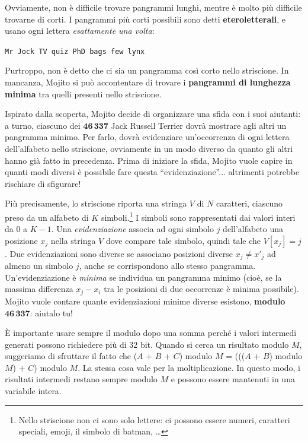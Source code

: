 Ovviamente, non è difficile trovare pangrammi lunghi, mentre è molto più
difficile trovarne di corti. I pangrammi più corti possibili sono detti
\textbf{eteroletterali}, e usano ogni lettera \emph{esattamente una volta}:%
%
\begin{center}
  \texttt{Mr Jock TV quiz PhD bags few lynx}
\end{center}%
%
Purtroppo, non è detto che ci sia un pangramma così corto nello striscione. In
mancanza, Mojito si può accontentare di trovare i \textbf{pangrammi di lunghezza
minima} tra quelli presenti nello striscione.

Ispirato dalla scoperta, Mojito decide di organizzare una sfida con i suoi
aiutanti: a turno, ciascuno dei $\mathbf{46\,337}$ Jack Russell Terrier dovrà
mostrare agli altri un pangramma minimo. Per farlo, dovrà evidenziare
un'occorrenza di ogni lettera dell'alfabeto nello striscione, ovviamente in un
modo diverso da quanto gli altri hanno già fatto in precedenza. Prima di
iniziare la sfida, Mojito vuole capire in quanti modi diversi è possibile fare
questa ``evidenziazione''... altrimenti potrebbe rischiare di sfigurare!

Più precisamente, lo striscione riporta una stringa $V$ di $N$ caratteri,
ciascuno preso da un alfabeto di $K$ simboli.\footnote{Nello striscione non ci
sono solo lettere: ci possono essere numeri, caratteri speciali, emoji, il
simbolo di batman, \dots} I simboli sono rappresentati dai valori interi da $0$
a $K-1$. Una \emph{evidenziazione} associa ad ogni simbolo $j$ dell'alfabeto una
posizione $x_j$ nella stringa $V$ dove compare tale simbolo, quindi tale che
$V[x_j] = j$. Due evidenziazioni sono diverse se associano posizioni diverse
$x_j \neq x'_j$ ad almeno un simbolo $j$, anche se corrispondono allo stesso
pangramma. Un'evidenziazione è \emph{minima} se individua un pangramma minimo
(cioè, se la massima differenza $x_j - x_i$ tra le posizioni di due occorrenze è
minima possibile). Mojito vuole contare quante evidenziazioni minime diverse
esistono, \textbf{modulo} $\mathbf{46\,337}$: aiutalo tu!



\Implementation

\begin{danger}
  È importante usare sempre il modulo dopo una somma perché i valori intermedi
  generati possono richiedere più di 32 bit. Quando si cerca un risultato modulo
  $M$, suggeriamo di sfruttare il fatto che ($A$ + $B$ + $C$) modulo $M$ =
  ((($A$ + $B$) modulo $M$) + $C$) modulo $M$. La stessa cosa vale per la
  moltiplicazione. In questo modo, i risultati intermedi restano sempre modulo
  $M$ e possono essere mantenuti in una variabile intera.
\end{danger}


